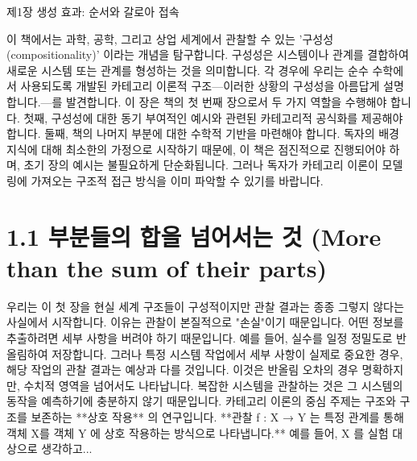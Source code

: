 \documentclass[11pt, a4paper, twoside, openany]{book}
\begin{document}
\tableofcontents
\clearpage


제1장 생성 효과: 순서와 갈로아 접속

이 책에서는 과학, 공학, 그리고 상업 세계에서 관찰할 수 있는 '구성성(compositionality)' 이라는 개념을 탐구합니다. 구성성은 시스템이나 관계를 결합하여 새로운 시스템 또는 관계를 형성하는 것을 의미합니다. 각 경우에 우리는 순수 수학에서 사용되도록 개발된 카테고리 이론적 구조—이러한 상황의 구성성을 아름답게 설명합니다.—를 발견합니다. 이 장은 책의 첫 번째 장으로서 두 가지 역할을 수행해야 합니다. 첫째, 구성성에 대한 동기 부여적인 예시와 관련된 카테고리적 공식화를 제공해야 합니다. 둘째, 책의 나머지 부분에 대한 수학적 기반을 마련해야 합니다. 독자의 배경 지식에 대해 최소한의 가정으로 시작하기 때문에, 이 책은 점진적으로 진행되어야 하며, 초기 장의 예시는 불필요하게 단순화됩니다. 그러나 독자가 카테고리 이론이 모델링에 가져오는 구조적 접근 방식을 이미 파악할 수 있기를 바랍니다.


\section{1.1 부분들의 합을 넘어서는 것 (More than the sum of their parts)}
\par\medskip


우리는 이 첫 장을 현실 세계 구조들이 구성적이지만 관찰 결과는 종종 그렇지 않다는 사실에서 시작합니다. 이유는 관찰이 본질적으로 "손실"이기 때문입니다. 어떤 정보를 추출하려면 세부 사항을 버려야 하기 때문입니다. 예를 들어, 실수를 일정 정밀도로 반올림하여 저장합니다. 그러나 특정 시스템 작업에서 세부 사항이 실제로 중요한 경우, 해당 작업의 관찰 결과는 예상과 다를 것입니다. 이것은 반올림 오차의 경우 명확하지만, 수치적 영역을 넘어서도 나타납니다. 복잡한 시스템을 관찰하는 것은 그 시스템의 동작을 예측하기에 충분하지 않기 때문입니다. 카테고리 이론의 중심 주제는 구조와 구조를 보존하는 **상호 작용** 의 연구입니다.  **관찰 f : X → Y 는 특정 관계를 통해 객체 X를 객체 Y 에 상호 작용하는 방식으로 나타냅니다.** 예를 들어, X 를 실험 대상으로 생각하고...
\end{document}
